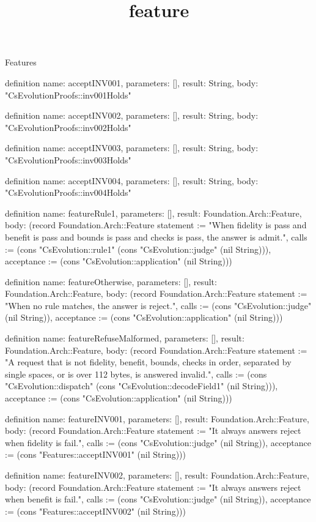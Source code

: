 \begin{lexlean}{Features}
\title{feature}
\begin{semanticmodule}
definition{
  name: acceptINV001,
  parameters: [],
  result: String,
  body: "CsEvolutionProofs::inv001Holds"
}

definition{
  name: acceptINV002,
  parameters: [],
  result: String,
  body: "CsEvolutionProofs::inv002Holds"
}

definition{
  name: acceptINV003,
  parameters: [],
  result: String,
  body: "CsEvolutionProofs::inv003Holds"
}

definition{
  name: acceptINV004,
  parameters: [],
  result: String,
  body: "CsEvolutionProofs::inv004Holds"
}

definition{
  name: featureRule1,
  parameters: [],
  result: Foundation.Arch::Feature,
  body: (record Foundation.Arch::Feature {statement := "When fidelity is pass and benefit is pass and bounds is pass and checks is pass, the answer is admit.", calls := (cons "CsEvolution::rule1" (cons "CsEvolution::judge" (nil String))), acceptance := (cons "CsEvolution::application" (nil String))})
}

definition{
  name: featureOtherwise,
  parameters: [],
  result: Foundation.Arch::Feature,
  body: (record Foundation.Arch::Feature {statement := "When no rule matches, the answer is reject.", calls := (cons "CsEvolution::judge" (nil String)), acceptance := (cons "CsEvolution::application" (nil String))})
}

definition{
  name: featureRefuseMalformed,
  parameters: [],
  result: Foundation.Arch::Feature,
  body: (record Foundation.Arch::Feature {statement := "A request that is not fidelity, benefit, bounds, checks in order, separated by single spaces, or is over 112 bytes, is answered invalid.", calls := (cons "CsEvolution::dispatch" (cons "CsEvolution::decodeField1" (nil String))), acceptance := (cons "CsEvolution::application" (nil String))})
}

definition{
  name: featureINV001,
  parameters: [],
  result: Foundation.Arch::Feature,
  body: (record Foundation.Arch::Feature {statement := "It always answers reject when fidelity is fail.", calls := (cons "CsEvolution::judge" (nil String)), acceptance := (cons "Features::acceptINV001" (nil String))})
}

definition{
  name: featureINV002,
  parameters: [],
  result: Foundation.Arch::Feature,
  body: (record Foundation.Arch::Feature {statement := "It always answers reject when benefit is fail.", calls := (cons "CsEvolution::judge" (nil String)), acceptance := (cons "Features::acceptINV002" (nil String))})
}


\end{semanticmodule}
\end{lexlean}

